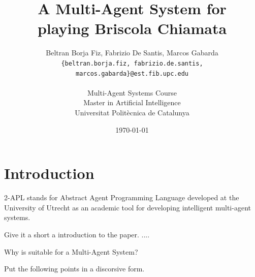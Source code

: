 \documentclass[a4paper]{article}
\begin{document}
\title{A Multi-Agent System for\\ playing Briscola Chiamata}
 
\author{Beltran Borja Fiz, Fabrizio De Santis, Marcos Gabarda\\
\small \texttt{\{beltran.borja.fiz, fabrizio.de.santis, marcos.gabarda\}@est.fib.upc.edu}\\
\\
Multi-Agent Systems Course\\
Master in Artificial Intelligence\\
Universitat Polit\`ecnica de Catalunya}
\date{\today}

\newenvironment{fminipage}%
  {\begin{Sbox}\begin{minipage}}%
  {\end{minipage}\end{Sbox}\fbox{\TheSbox}}


\maketitle

\tableofcontents

\newpage

\section{Introduction}\label{sec:intro}

2-APL stands for Abstract Agent Programming Language developed at the University of Utrecht as an academic tool for developing intelligent multi-agent systems.

Give it a short a introduction to the paper.
....

Why is suitable for a Multi-Agent System?

Put the following points in a discorsive form.
\end{document}
